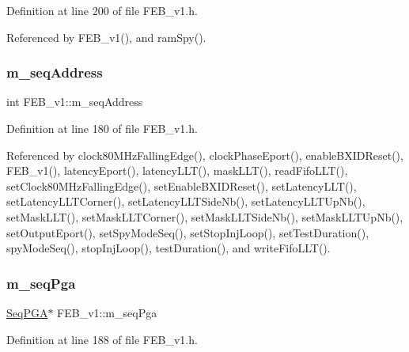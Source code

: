 Definition at line 200 of file F\+E\+B\+\_\+v1.\+h.



Referenced by F\+E\+B\+\_\+v1(), and ram\+Spy().

\mbox{\label{classFEB__v1_a1c1eb093fd1733b9510fcf8bc5c7ad08}} 
\subsubsection{\texorpdfstring{m\+\_\+seq\+Address}{m\_seqAddress}}
{\footnotesize\ttfamily int F\+E\+B\+\_\+v1\+::m\+\_\+seq\+Address\hspace{0.3cm}{\ttfamily [private]}}



Definition at line 180 of file F\+E\+B\+\_\+v1.\+h.



Referenced by clock80\+M\+Hz\+Falling\+Edge(), clock\+Phase\+Eport(), enable\+B\+X\+I\+D\+Reset(), F\+E\+B\+\_\+v1(), latency\+Eport(), latency\+L\+L\+T(), mask\+L\+L\+T(), read\+Fifo\+L\+L\+T(), set\+Clock80\+M\+Hz\+Falling\+Edge(), set\+Enable\+B\+X\+I\+D\+Reset(), set\+Latency\+L\+L\+T(), set\+Latency\+L\+L\+T\+Corner(), set\+Latency\+L\+L\+T\+Side\+Nb(), set\+Latency\+L\+L\+T\+Up\+Nb(), set\+Mask\+L\+L\+T(), set\+Mask\+L\+L\+T\+Corner(), set\+Mask\+L\+L\+T\+Side\+Nb(), set\+Mask\+L\+L\+T\+Up\+Nb(), set\+Output\+Eport(), set\+Spy\+Mode\+Seq(), set\+Stop\+Inj\+Loop(), set\+Test\+Duration(), spy\+Mode\+Seq(), stop\+Inj\+Loop(), test\+Duration(), and write\+Fifo\+L\+L\+T().

\mbox{\label{classFEB__v1_a6c7804ac86796f233a8393043adf2e77}} 
\subsubsection{\texorpdfstring{m\+\_\+seq\+Pga}{m\_seqPga}}
{\footnotesize\ttfamily \hyperlink{classSeqPGA}{Seq\+P\+GA}$\ast$ F\+E\+B\+\_\+v1\+::m\+\_\+seq\+Pga\hspace{0.3cm}{\ttfamily [private]}}



Definition at line 188 of file F\+E\+B\+\_\+v1.\+h.



